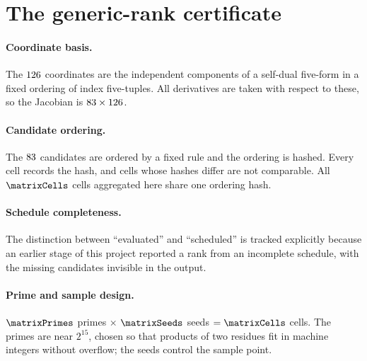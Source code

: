 \section{The generic-rank certificate}
\label{app:rank81}

\paragraph{Coordinate basis.}
The $126$ coordinates are the independent components of a
self-dual five-form in a fixed ordering of index five-tuples. All derivatives are
taken with respect to these, so the Jacobian is
$83 \times 126$.

\paragraph{Candidate ordering.}
The $83$ candidates are ordered by a fixed rule and the ordering
is hashed. Every cell records the hash, and cells whose hashes differ are not
comparable. All $\matrixCells$ cells aggregated here share one ordering hash.

\paragraph{Schedule completeness.}
\begin{center}
\footnotesize
{}
\end{center}
The distinction between ``evaluated'' and ``scheduled'' is tracked explicitly
because an earlier stage of this project reported a rank from an incomplete
schedule, with the missing candidates invisible in the output.

\paragraph{Prime and sample design.}
$\matrixPrimes$ primes $\times$ $\matrixSeeds$ seeds $= \matrixCells$ cells. The
primes are near $2^{15}$, chosen so that products of two residues fit in machine
integers without overflow; the seeds control the sample point.

